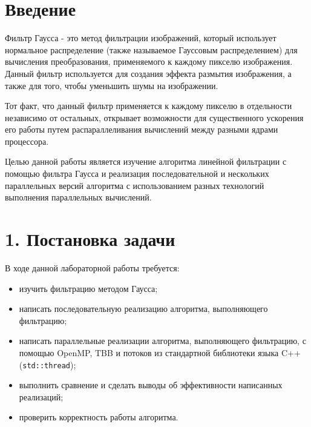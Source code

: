 \documentclass{report}
\begin{document}
    \newpage
    \section*{Введение}
    \par Фильтр Гаусса - это метод фильтрации изображений, который использует нормальное распределение (также называемое Гауссовым распределением) для вычисления преобразования, применяемого к каждому пикселю изображения. Данный фильтр используется для создания эффекта размытия изображения, а также для того, чтобы уменьшить шумы на изображении.
    \par Тот факт, что данный фильтр применяется к каждому пикселю в отдельности независимо от остальных, открывает возможности для существенного ускорения его работы путем распараллеливания вычислений между разными ядрами процессора.
    \par Целью данной работы является изучение алгоритма линейной фильтрации с помощью фильтра Гаусса и реализация последовательной и нескольких параллельных версий алгоритма с использованием разных технологий выполнения параллельных вычислений.


    \newpage
    \section*{1. Постановка задачи}

    \par В ходе данной лабораторной работы требуется:
    \begin{itemize}
        \item изучить фильтрацию методом Гаусса;
        \item написать последовательную реализацию алгоритма, выполняющего фильтрацию;
        \item написать параллельные реализации алгоритма, выполняющего фильтрацию, с помощью OpenMP, TBB и потоков из стандартной библиотеки языка C++ (\verb|std::thread|);
        \item выполнить сравнение и сделать выводы об эффективности написанных реализаций;
        \item проверить корректность работы алгоритма.
    \end{itemize}
\end{document}
